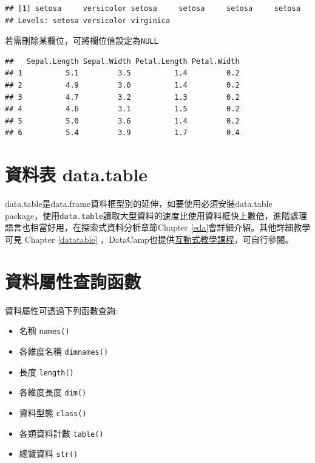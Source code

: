 \documentclass[]{book}
\newenvironment{Shaded}{\begin{snugshade}}{\end{snugshade}}
\newcommand{\KeywordTok}[1]{\textcolor[rgb]{0.13,0.29,0.53}{\textbf{{#1}}}}
\newcommand{\OtherTok}[1]{\textcolor[rgb]{0.56,0.35,0.01}{{#1}}}
\newcommand{\NormalTok}[1]{{#1}}
\providecommand{\tightlist}{%
  \setlength{\itemsep}{0pt}\setlength{\parskip}{0pt}}
\theoremstyle{definition}
\theoremstyle{definition}
\theoremstyle{remark}
\begin{document}
\begin{verbatim}
## [1] setosa     versicolor setosa     setosa     setosa     setosa    
## Levels: setosa versicolor virginica
\end{verbatim}

若需刪除某欄位，可將欄位值設定為\texttt{NULL}

\begin{Shaded}
\end{Shaded}

\begin{verbatim}
##   Sepal.Length Sepal.Width Petal.Length Petal.Width
## 1          5.1         3.5          1.4         0.2
## 2          4.9         3.0          1.4         0.2
## 3          4.7         3.2          1.3         0.2
## 4          4.6         3.1          1.5         0.2
## 5          5.0         3.6          1.4         0.2
## 6          5.4         3.9          1.7         0.4
\end{verbatim}

\section{資料表 data.table}\label{-data.table}

data.table是data.frame資料框型別的延伸，如要使用必須安裝data.table
\citep{R-data.table}
package，使用\texttt{data.table}讀取大型資料的速度比使用資料框快上數倍，進階處理語言也相當好用，在探索式資料分析章節Chapter
\ref{eda}會詳細介紹。其他詳細教學可見 Chapter \ref{datatable}
，DataCamp也提供\href{https://www.datacamp.com/courses/data-table-data-manipulation-r-tutorial}{互動式教學課程}，可自行參閱。

\section{資料屬性查詢函數}

資料屬性可透過下列函數查詢:

\begin{itemize}
\tightlist
\item
  名稱 \texttt{names()}
\item
  各維度名稱 \texttt{dimnames()}
\item
  長度 \texttt{length()}
\item
  各維度長度 \texttt{dim()}
\item
  資料型態 \texttt{class()}
\item
  各類資料計數 \texttt{table()}
\item
  總覽資料 \texttt{str()}
\end{itemize}
\end{document}
